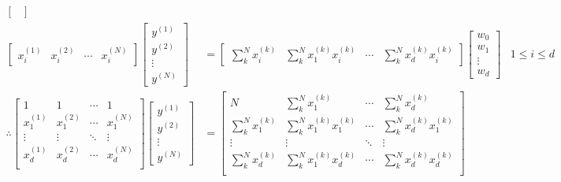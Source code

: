 \begin{enumerate}[label=(\alph*)]
\begin{align*}
\begin{bmatrix}
		      \end{bmatrix}
		      \\
		      \begin{bmatrix}
			      x_i^{(1)} & x_i^{(2)} & \cdots & x_i^{(N)}
		      \end{bmatrix}
		      \begin{bmatrix}
			      y^{(1)} \\ y^{(2)} \\ \vdots \\ y^{(N)}
		      \end{bmatrix}
		       & =
		      \begin{bmatrix}
			      \sum_k^N x_i^{(k)} & \sum_k^N x_1^{(k)} x_i^{(k)} & \cdots & \sum_k^N x_d^{(k)} x_i^{(k)}
		      \end{bmatrix}
		      \begin{bmatrix}
			      w_0 \\ w_1 \\ \vdots \\ w_d
		      \end{bmatrix}
		       & 1 \le i \le d
		      \\
		      \therefore
		      \begin{bmatrix}
			      1         & 1         & \cdots & 1         \\
			      x_1^{(1)} & x_1^{(2)} & \cdots & x_1^{(N)} \\
			      \vdots    & \vdots    & \ddots & \vdots    \\
			      x_d^{(1)} & x_d^{(2)} & \cdots & x_d^{(N)} \\
		      \end{bmatrix}
		      \begin{bmatrix}
			      y^{(1)} \\ y^{(2)} \\ \vdots \\ y^{(N)}
		      \end{bmatrix}
		       & =
		      \begin{bmatrix}
			      N                  & \sum_k^N x_1^{(k)}           & \cdots & \sum_k^N x_d^{(k)}           \\
			      \sum_k^N x_1^{(k)} & \sum_k^N x_1^{(k)} x_1^{(k)} & \cdots & \sum_k^N x_d^{(k)} x_1^{(k)} \\
			      \vdots             & \vdots                       & \ddots & \vdots                       \\
			      \sum_k^N x_d^{(k)} & \sum_k^N x_1^{(k)} x_d^{(k)} & \cdots & \sum_k^N x_d^{(k)} x_d^{(k)} \\

\end{bmatrix}
\end{align*}
\end{enumerate}
